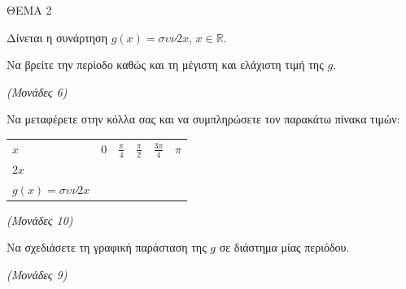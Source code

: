 \documentclass[11pt,a4paper,twoside]{book}
\newcommand{\monades}[1]{\hfill \textit{(Μονάδες #1)}}
\begin{document}
\vspace{4mm}

ΘEMA 2

Δίνεται η συνάρτηση $g(x) = \sigma\upsilon\nu 2x$, $x \in \mathbb{R}$.

\begin{alist}
\item Να βρείτε την περίοδο καθώς και τη μέγιστη και ελάχιστη τιμή της $g$.

\monades{6}

\item

\begin{rlist}
\item Να μεταφέρετε στην κόλλα σας και να συμπληρώσετε τον παρακάτω πίνακα τιμών:

\begin{longtable}[]{@{}
  >{\centering\arraybackslash}p{}
  >{\centering\arraybackslash}p{}
  >{\centering\arraybackslash}p{}
  >{\centering\arraybackslash}p{}
  >{\centering\arraybackslash}p{}
  >{\centering\arraybackslash}p{}@{}}
\noalign{}
\begin{minipage}[b]{\linewidth}\centering
$x$
\end{minipage} & \begin{minipage}[b]{\linewidth}\centering
$0$
\end{minipage} & \begin{minipage}[b]{\linewidth}\centering
$\frac{\pi}{4}$
\end{minipage} & \begin{minipage}[b]{\linewidth}\centering
$\frac{\pi}{2}$
\end{minipage} & \begin{minipage}[b]{\linewidth}\centering
$\frac{3\pi}{4}$
\end{minipage} & \begin{minipage}[b]{\linewidth}\centering
$\pi$
\end{minipage} \\
\noalign{}

\noalign{}
\endlastfoot
$2x$ & & & & & \\
$g(x) = \sigma\upsilon\nu 2x$ & & & & & \\
\end{longtable}

\monades{10}

\item Να σχεδιάσετε τη γραφική παράσταση της $g$ σε διάστημα μίας περιόδου.

\monades{9}
\end{rlist}
\end{alist}
\end{document}
